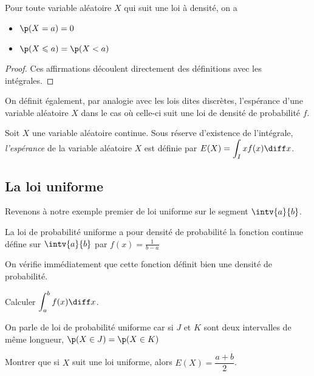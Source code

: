 \documentclass[12pt,a4paper,french]{article}
\begin{document}
\begin{proposition}
  Pour toute variable aléatoire $X$ qui suit une loi à densité, on a
  \begin{itemize}
    \item $\p(X = a) = 0$
    \item $\p(X \leqslant a ) = \p(X < a)$
  \end{itemize}
\end{proposition}
\begin{proof}
  Ces affirmations découlent directement des définitions avec les
  intégrales.
\end{proof}

On définit également, par analogie avec les lois dites discrètes,
l'espérance d'une variable aléatoire $X$ dans le cas où celle-ci suit
une loi de densité de probabilité $f$.

\begin{definition}
  Soit $X$ une variable aléatoire continue.
  Sous réserve d'existence de l'intégrale, \emph{l'espérance} de la
  variable aléatoire $X$ est définie par $E(X) = \displaystyle\int_I xf(x)
  \diff x$.
\end{definition}

\subsection{La loi uniforme}

Revenons à notre exemple premier de loi uniforme sur le segment
$\intv{a}{b}$.

\begin{definition}
  La loi de probabilité uniforme a pour densité de probabilité la
  fonction continue défine sur $\intv{a}{b}$ par $f(x) = \frac1{b-a}$
\end{definition}

On vérifie immédiatement que cette fonction définit bien une densité de
probabilité.

\begin{question}
  Calculer $\displaystyle\int_a^b f(x) \diff x$.
\end{question}

On parle de loi de probabilité uniforme car si $J$ et $K$ sont deux
intervalles de même longueur, $\p(X\in J) = \p(X \in K)$

\begin{question}
  Montrer que si $X$ suit une loi uniforme, alors $E(X) = \dfrac{a+b}2$.
\end{question}
\end{document}
